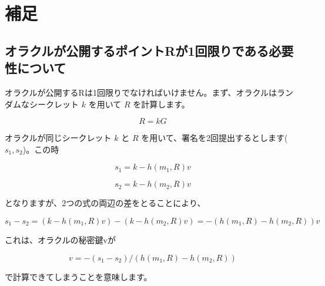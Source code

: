 \documentclass[11pt]{article}
\begin{document}
\section*{補足}

\subsection*{オラクルが公開するポイントRが1回限りである必要性について}

オラクルが公開するRは1回限りでなければいけません。まず、オラクルはランダムなシークレット \(k\) を用いて \(R\) を計算します。

\[R = kG\]

オラクルが同じシークレット \(k\) と \(R\) を用いて、署名を2回提出するとします(\(s_{1}, s_{2}\))。この時

\[s_{1} = k - h(m_{1}, R)v\]

\[s_{2} = k - h(m_{2}, R)v\]

となりますが、2つの式の両辺の差をとることにより、

\[s_{1} - s_{2} = (k - h(m_{1}, R)v) - (k - h(m_{2}, R)v) = -(h(m_{1}, R) - h(m_{2}, R))v \]

これは、オラクルの秘密鍵vが

\[v = -(s_{1} - s_{2})/(h(m_{1}, R) - h(m_{2}, R)) \]

で計算できてしまうことを意味します。
\end{document}
